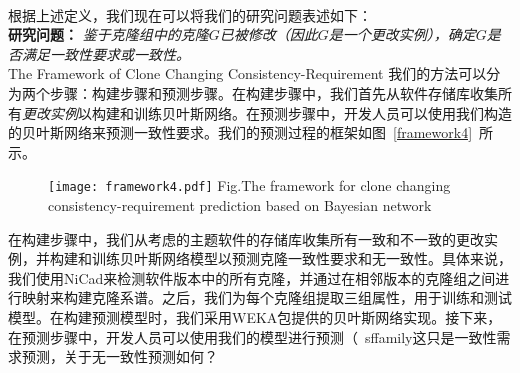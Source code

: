 ~\\
根据上述定义，我们现在可以将我们的研究问题表述如下：\\

\noindent
\textbf {研究问题：} {\em 鉴于克隆组中的克隆$ G $已被修改（因此$ G $是一个更改实例），确定$ G $是否满足一致性要求或一致性。 } \\




{The Framework of Clone Changing Consistency-Requirement}
我们的方法可以分为两个步骤：构建步骤和预测步骤。在构建步骤中，我们首先从软件存储库收集所有{\em 更改实例}以构建和训练贝叶斯网络。在预测步骤中，开发人员可以使用我们构造的贝叶斯网络来预测一致性要求。我们的预测过程的框架如图~\ref{framework4}~所示。

\begin{figure}[htbp]
\centering
\texttt{[image: framework4.pdf]}
{Fig.$\!$}{The framework for clone changing consistency-requirement prediction based on Bayesian network}
\vspace{-1em}
\end{figure}

在构建步骤中，我们从考虑的主题软件的存储库收集所有一致和不一致的更改实例，并构建和训练贝叶斯网络模型以预测克隆一致性要求和无一致性。具体来说，我们使用NiCad来检测软件版本中的所有克隆，并通过在相邻版本的克隆组之间进行映射来构建克隆系谱。之后，我们为每个克隆组提取三组属性，用于训练和测试模型。在构建预测模型时，我们采用WEKA包提供的贝叶斯网络实现。接下来，在预测步骤中，开发人员可以使用我们的模型进行预测{（{\ sffamily这只是一致性需求预测，关于无一致性预测如何？}}

